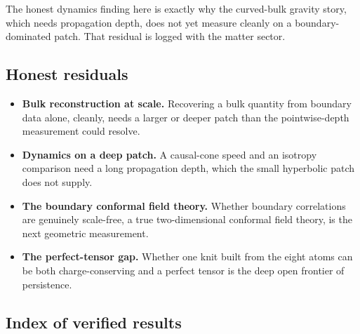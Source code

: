 The honest dynamics finding here is exactly why the curved-bulk gravity story, which needs propagation depth, does not yet measure cleanly on a boundary-dominated patch. That residual is logged with the matter sector.

\subsection{Honest residuals}

\begin{itemize}
\item \textbf{Bulk reconstruction at scale.} Recovering a bulk quantity from boundary data alone, cleanly, needs a larger or deeper patch than the pointwise-depth measurement could resolve.
\item \textbf{Dynamics on a deep patch.} A causal-cone speed and an isotropy comparison need a long propagation depth, which the small hyperbolic patch does not supply.
\item \textbf{The boundary conformal field theory.} Whether boundary correlations are genuinely scale-free, a true two-dimensional conformal field theory, is the next geometric measurement.
\item \textbf{The perfect-tensor gap.} Whether one knit built from the eight atoms can be both charge-conserving and a perfect tensor is the deep open frontier of persistence.
\end{itemize}

\subsection{Index of verified results}

